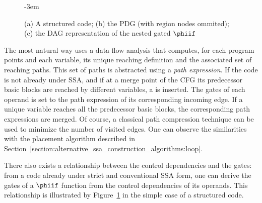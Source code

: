 \begin{figure}
\kern-3em
\caption{(a) A structured code; (b) the PDG (with region nodes ommited); (c) the DAG representation of the nested gated $\phiif$ \label{fig:vsdg:structured}}
\end{figure}

The most natural way uses a data-flow analysis that computes, for each program points and each variable, its unique reaching definition and the associated set of reaching paths. 
This set of paths is abstracted using a \emph{path expression}. 
If the code is not already under SSA, and if at a merge point of the CFG its predecessor basic blocks are reached by different variables, a \phifun is inserted. 
The gates of each operand is set to the path expression of its corresponding incoming edge. 
If a unique variable reaches all the predecessor basic blocks, the corresponding path expressions are merged. 
Of course, a classical path compression technique can be used to minimize the number of visited edges. 
One can observe the similarities with the \phifun placement algorithm described in Section~\ref{section:alternative_ssa_construction_algorithms:loop}.

There also exists a relationship between the control dependencies and the gates: 
from a code already under strict and conventional SSA form, one can derive the gates of a $\phiif$ function from the control dependencies of its operands. 
This relationship is illustrated by Figure~\ref{fig:vsdg:structured} in the simple case of a structured code.
 
